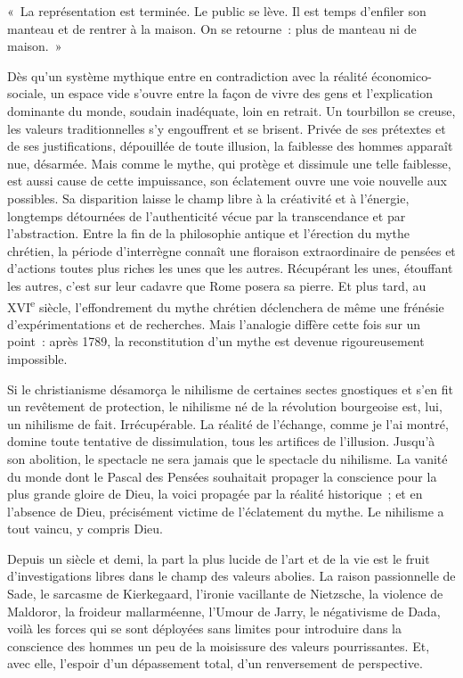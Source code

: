 \documentclass[french,twoside]{book} %
\newenvironment{quoteblock}%
  {\begin{quoting}}
  {\end{quoting}}
\newenvironment{quotebar}{%
    \def\FrameCommand{{\color{rubric!10!}\vrule width 0.5em} \hspace{0.9em}}%
    \def\OuterFrameSep{\itemsep} %
    \MakeFramed {\advance\hsize-\width \FrameRestore}
  }%
  {%
    \endMakeFramed
  }
\renewenvironment{quoteblock}%
  {%
    \savenotes
    \setstretch{0.9}
    \normalfont
    \begin{quotebar}
  }
  {%
    \end{quotebar}
    \spewnotes
  }
\begin{document}
\begin{quoteblock}
\noindent « La représentation est terminée. Le public se lève. Il est temps d’enfiler son manteau et de rentrer à la maison. On se retourne : plus de manteau ni de maison. »\end{quoteblock}

\noindent Dès qu’un système mythique entre en contradiction avec la réalité économico-sociale, un espace vide s’ouvre entre la façon de vivre des gens et l’explication dominante du monde, soudain inadéquate, loin en retrait. Un tourbillon se creuse, les valeurs traditionnelles s’y engouffrent et se brisent. Privée de ses prétextes et de ses justifications, dépouillée de toute illusion, la faiblesse des hommes apparaît nue, désarmée. Mais comme le mythe, qui protège et dissimule une telle faiblesse, est aussi cause de cette impuissance, son éclatement ouvre une voie nouvelle aux possibles. Sa disparition laisse le champ libre à la créativité et à l’énergie, longtemps détournées de l’authenticité vécue par la transcendance et par l’abstraction. Entre la fin de la philosophie antique et l’érection du mythe chrétien, la période d’interrègne connaît une floraison extraordinaire de pensées et d’actions toutes plus riches les unes que les autres. Récupérant les unes, étouffant les autres, c’est sur leur cadavre que Rome posera sa pierre. Et plus tard, au XVI\textsuperscript{e} siècle, l’effondrement du mythe chrétien déclenchera de même une frénésie d’expérimentations et de recherches. Mais l’analogie diffère cette fois sur un point : après 1789, la reconstitution d’un mythe est devenue rigoureusement impossible.\par
Si le christianisme désamorça le nihilisme de certaines sectes gnostiques et s’en fit un revêtement de protection, le nihilisme né de la révolution bourgeoise est, lui, un nihilisme de fait. Irrécupérable. La réalité de l’échange, comme je l’ai montré, domine toute tentative de dissimulation, tous les artifices de l’illusion. Jusqu’à son abolition, le spectacle ne sera jamais que le spectacle du nihilisme. La vanité du monde dont le Pascal des Pensées souhaitait propager la conscience pour la plus grande gloire de Dieu, la voici propagée par la réalité historique ; et en l’absence de Dieu, précisément victime de l’éclatement du mythe. Le nihilisme a tout vaincu, y compris Dieu.\par
Depuis un siècle et demi, la part la plus lucide de l’art et de la vie est le fruit d’investigations libres dans le champ des valeurs abolies. La raison passionnelle de Sade, le sarcasme de Kierkegaard, l’ironie vacillante de Nietzsche, la violence de Maldoror, la froideur mallarméenne, l’Umour de Jarry, le négativisme de Dada, voilà les forces qui se sont déployées sans limites pour introduire dans la conscience des hommes un peu de la moisissure des valeurs pourrissantes. Et, avec elle, l’espoir d’un dépassement total, d’un renversement de perspective.\par
\end{document}
